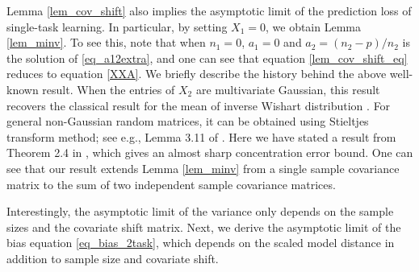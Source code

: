 Lemma \ref{lem_cov_shift} also implies the asymptotic limit of the prediction loss of single-task learning.
In particular, by setting $X_1 = 0$, we obtain Lemma \ref{lem_minv}.
To see this, note that when $n_1=0$, $a_1 = 0$ and $a_2 = (n_2-p) / n_2$ is the solution of \eqref{eq_a12extra}, and one can see that equation \eqref{lem_cov_shift_eq} reduces to equation \eqref{XXA}.
We briefly describe the history behind the above well-known result.
When the entries of $X_2$ are multivariate Gaussian, this result recovers the classical result for the mean of inverse Wishart distribution \cite{anderson1958introduction}.
For general non-Gaussian random matrices, it can be obtained using Stieltjes transform method; see e.g., Lemma 3.11 of \cite{bai2009spectral}.
Here we have stated a result from Theorem 2.4 in \cite{isotropic}, which gives an almost sharp concentration error bound.
One can see that our result extends Lemma \ref{lem_minv} from a single sample covariance matrix to the sum of two independent sample covariance matrices.

Interestingly, the asymptotic limit of the variance only depends on the sample sizes and the covariate shift matrix.
Next, we derive the asymptotic limit of the bias equation \eqref{eq_bias_2task}, which depends on the scaled model distance in addition to sample size and covariate shift. %


